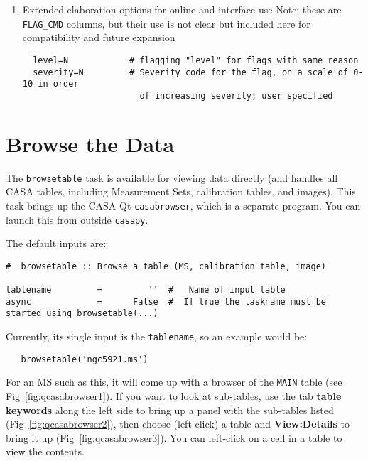 \begin{enumerate}
\item Extended elaboration options for online and interface use Note:
these are {\tt FLAG\_CMD} columns, but their use is not clear but included
here for compatibility and future expansion

\small
\begin{verbatim}
  level=N            # flagging "level" for flags with same reason
  severity=N         # Severity code for the flag, on a scale of 0-10 in order 
                       of increasing severity; user specified
\end{verbatim}
\normalsize

\end{enumerate}

\section{Browse the Data}
\label{section:edit.browse}

The {\tt browsetable} task is available for viewing data directly
(and handles all CASA tables, including Measurement Sets, calibration tables,
and images). This task brings up the CASA Qt
{\tt casabrowser}, which is a separate program.  You can launch this
from outside {\tt casapy}.  

The default inputs are:
\small
\begin{verbatim}
#  browsetable :: Browse a table (MS, calibration table, image)

tablename         =         ''  #   Name of input table
async             =      False  #  If true the taskname must be started using browsetable(...)

\end{verbatim}
\normalsize

Currently, its single input is the {\tt tablename}, so an example would
be:
\small
\begin{verbatim}
   browsetable('ngc5921.ms')
\end{verbatim}
\normalsize
For an MS such as this, it will come up with a browser of the 
{\tt MAIN} table (see Fig~\ref{fig:qcasabrowser1}).  
If you want to look at sub-tables, use the tab 
{\bf table keywords} along the left side to bring up a panel with the sub-tables
listed (Fig~\ref{fig:qcasabrowser2}), then choose (left-click) a table and
{\bf View:Details} to bring it up (Fig~\ref{fig:qcasabrowser3}).  
You can left-click on a cell in a table to view the
contents.

